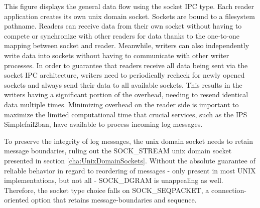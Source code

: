 This figure displays the general data flow using the socket \ac{IPC} type.
Each reader application creates its own unix domain socket.
Sockets are bound to a filesystem pathname.
Readers can receive data from their own socket without having to compete or synchronize with other readers for data thanks to the one-to-one mapping between socket and reader.
Meanwhile, writers can also independently write data into sockets without having to communicate with other writer processes.
In order to guarantee that readers receive all data being sent via the socket \ac{IPC} architecture, writers need to periodically recheck for newly opened sockets and always send their data to all available sockets.
This results in the writers having a significant portion of the overhead, needing to resend identical data multiple times.
Minimizing overhead on the reader side is important to maximize the limited computational time that crucial services, such as the \ac{IPS} Simplefail2ban, have available to process incoming log messages.

To preserve the integrity of log messages, the unix domain socket needs to retain message boundaries, ruling out the SOCK\_STREAM unix domain socket presented in section \ref{cha:UnixDomainSockets}.
Without the absolute guarantee of reliable behavior in regard to reordering of messages - only present in most UNIX implementations, but not all\cite{man:unixsockets} - SOCK\_DGRAM is unappealing as well.
Therefore, the socket type choice falls on SOCK\_SEQPACKET, a connection-oriented option that retains message-boundaries and sequence.